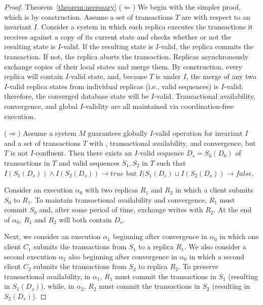 \begin{proof}{Theorem~\ref{theorem:necessary}}
($\Leftarrow$) We begin with the simpler proof, which is by
  construction. Assume a set of transactions $T$ are \iconfluent with
  respect to an invariant $I$. Consider a system in which each replica
  executes the transactions it receives against a copy of its current
  state and checks whether or not the resulting state is $I$-valid. If
  the resulting state is $I$-valid, the replica commits the
  transaction. If not, the replica aborts the transaction. Replicas
  asynchronously exchange copies of their local states and merge
  them. By construction, every replica will contain $I$-valid state,
  and, because $T$ is \iconfluent under $I$, the merge of any two
  $I$-valid replica states from individual replicas (i.e., valid
  sequences) is $I$-valid; therefore, the converged database state
  will be $I$-valid. Transactional availability, convergence, and
  global $I$-validity are all maintained via coordination-free
  execution.

($\Rightarrow$) Assume a system $M$ guarantees globally $I$-valid
  operation for invariant $I$ and a set of transactions $T$ with
  \cfreedom, transactional availability, and convergence, but $T$ is
  not $I$-confluent. Then there exists an $I$-valid sequence
  $D_s=S_0(D_0)$ of transactions in $T$ and valid sequences $S_1,S_2$
  in $T$ such that $I(S_1(D_s)) \wedge I(S_2(D_s)) \rightarrow true$
  but $I(S_1(D_s) \sqcup I(S_2(D_s)) \rightarrow false$.

  Consider an execution $\alpha_0$ with two replicas $R_1$ and $R_2$
  in which a client submits $S_0$ to $R_1$. To maintain transactional
  availability and convergence, $R_1$ must commit $S_0$ and, after
  some period of time, exchange writes with $R_2$. At the end of
  $\alpha_0$, $R_1$ and $R_2$ will both contain $D_s$.

  Next, we consider an execution $\alpha_1$ beginning after
  convergence in $\alpha_0$ in which one client $C_1$ submits the
  transactions from $S_1$ to a replica $R_1$. We also consider a
  second execution $\alpha_2$ also beginning after convergence in
  $\alpha_0$ in which a second client $C_2$ submits the transactions
  from $S_2$ to replica $R_2$. To preserve transactional availability,
  in $\alpha_1$, $R_1$ must commit the transactions in $S_1$
  (resulting in $S_1(D_s)$), while, in $\alpha_2$, $R_2$ must commit
  the transactions in $S_2$ (resulting in $S_2(D_s)$).


\end{proof}
